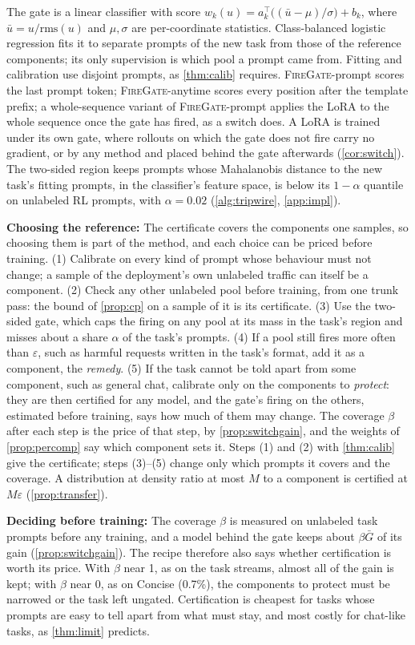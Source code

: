 \documentclass{article}
\theoremstyle{plain}
\theoremstyle{definition}
\theoremstyle{remark}
\newcommand{\methodp}{\textsc{FireGate}-prompt}
\newcommand{\methoda}{\textsc{FireGate}-anytime}
\begin{document}
The gate is a linear classifier with score $w_k(u)=a_k^\top\big((\bar u-\mu)/\sigma\big)+b_k$, where
$\bar u=u/\mathrm{rms}(u)$ and $\mu,\sigma$ are per-coordinate statistics. Class-balanced logistic regression fits it
to separate prompts of the new task from those of the reference components; its only supervision is which pool a
prompt came from. Fitting and calibration use disjoint prompts, as \cref{thm:calib} requires. \methodp{} scores the
last prompt token; \methoda{} scores every position after the template prefix; a whole-sequence variant of \methodp{}
applies the LoRA to the whole sequence once the gate has fired, as a switch does. A LoRA is trained under its own
gate, where rollouts on which the gate does not fire carry no gradient, or by any method and placed behind the gate
afterwards (\cref{cor:switch}). The two-sided region keeps prompts whose Mahalanobis distance to the new task's
fitting prompts, in the classifier's feature space, is below its $1-\alpha$ quantile on unlabeled RL prompts, with
$\alpha=0.02$ (\cref{alg:tripwire}, \cref{app:impl}).

\textbf{Choosing the reference:} The certificate covers the components one samples, so choosing them is part of the
method, and each choice can be priced before training. (1) Calibrate on every kind of prompt whose behaviour must not
change; a sample of the deployment's own unlabeled traffic can itself be a component. (2) Check any other unlabeled
pool before training, from one trunk pass: the bound of \cref{prop:cp} on a sample of it is its certificate. (3) Use
the two-sided gate, which caps the firing on any pool at its mass in the task's region and misses about a share
$\alpha$ of the task's prompts. (4) If a pool still fires more often than $\varepsilon$, such as harmful requests written in the task's
format, add it as a component, the \emph{remedy}. (5) If the task cannot be told apart from some component, such as
general chat, calibrate only on the components to \emph{protect}: they are then certified for any model, and the
gate's firing on the others, estimated before training, says how much of them may change. The coverage $\beta$ after
each step is the price of that step, by \cref{prop:switchgain}, and the weights of \cref{prop:percomp} say which
component sets it. Steps (1) and (2) with \cref{thm:calib} give the certificate; steps (3)--(5) change only which
prompts it covers and the coverage. A distribution at density ratio at most $M$ to a component is certified at
$M\varepsilon$ (\cref{prop:transfer}).

\textbf{Deciding before training:} The coverage $\beta$ is measured on unlabeled task prompts before any training, and
a model behind the gate keeps about $\beta\bar G$ of its gain (\cref{prop:switchgain}). The recipe therefore also says
whether certification is worth its price. With $\beta$ near 1, as on the task streams, almost all of the gain is kept;
with $\beta$ near 0, as on Concise (0.7\%), the components to protect must be narrowed or the task left ungated.
Certification is cheapest for tasks whose prompts are easy to tell apart from what must stay, and most costly for
chat-like tasks, as \cref{thm:limit} predicts.
\end{document}
